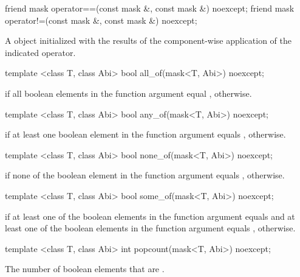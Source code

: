 \begin{itemdecl}
friend mask operator==(const mask &, const mask &) noexcept;
friend mask operator!=(const mask &, const mask &) noexcept;
\end{itemdecl}
\begin{itemdescr}
  \pnum\returns A \mask object initialized with the results of the component-wise application of the indicated operator.
\end{itemdescr}

\begin{itemdecl}
template <class T, class Abi> bool  all_of(mask<T, Abi>) noexcept;
\end{itemdecl}
\begin{itemdescr}
  \pnum\returns \true if all boolean elements in the function argument equal \true, \false otherwise.
\end{itemdescr}

\begin{itemdecl}
template <class T, class Abi> bool  any_of(mask<T, Abi>) noexcept;
\end{itemdecl}
\begin{itemdescr}
  \pnum\returns \true if at least one boolean element in the function argument equals \true, \false otherwise.
\end{itemdescr}

\begin{itemdecl}
template <class T, class Abi> bool none_of(mask<T, Abi>) noexcept;
\end{itemdecl}
\begin{itemdescr}
  \pnum\returns \true if none of the boolean element in the function argument equals \true, \false otherwise.
\end{itemdescr}

\begin{itemdecl}
template <class T, class Abi> bool some_of(mask<T, Abi>) noexcept;
\end{itemdecl}
\begin{itemdescr}
  \pnum\returns \true if at least one of the boolean elements in the function argument equals \true and at least one of the boolean elements in the function argument equals \false, \false otherwise.
\end{itemdescr}

\begin{itemdecl}
template <class T, class Abi> int popcount(mask<T, Abi>) noexcept;
\end{itemdecl}
\begin{itemdescr}
  \pnum\returns The number of boolean elements that are \true.
\end{itemdescr}

